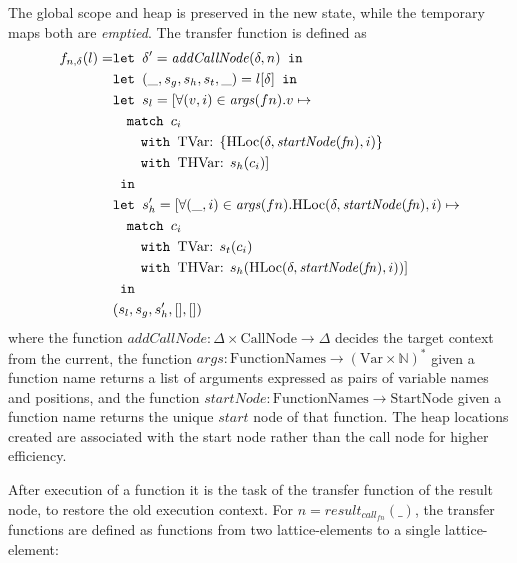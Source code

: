 The global scope and heap is preserved in the new state, while the temporary maps both are \emph{emptied}. The transfer function is defined as
\begin{align}
      f_{n,\delta}(l) =     &\texttt{let } \delta' = \mathit{addCallNode}(\delta, n) \texttt{ in }\notag\\
                            &\texttt{let } (\_, s_g, s_h,s_t, \_) = l[\delta] \texttt{ in }\notag\\
                            &\texttt{let } s_l = [\forall (v, i) \in \mathit{args}(fn). v \mapsto \notag\\
                            &\quad\texttt{match }c_i\notag\\
                            &\quad\quad\texttt{with }\text{TVar}\text{: } \{\text{HLoc}(\delta, \mathit{startNode}(\mathit{fn}), i)\}\notag\\
                            &\quad\quad\texttt{with }\text{THVar}\text{: } s_h(c_i)]\notag\\
                            & \texttt{ in }\notag\\
                            &\texttt{let } s_h' = [\forall (\_, i) \in \mathit{args}(fn). \text{HLoc}(\delta, \mathit{startNode}(\mathit{fn}), i) \mapsto \notag\\
                            &\quad\texttt{match }c_i\notag\\
                            &\quad\quad\texttt{with }\text{TVar}\text{: } s_t(c_i)\notag\\
                            &\quad\quad\texttt{with }\text{THVar}\text{: } s_h(\text{HLoc}(\delta, \mathit{startNode}(\mathit{fn}), i))]\notag\\
                            & \texttt{ in }\notag\\
                            &(s_l, s_g, s_h',[], [])
\end{align}
where the function $\mathit{addCallNode} : \Delta \times \text{CallNode} \rightarrow \Delta$ decides the target context from the current, the function $\mathit{args} : \text{FunctionNames} \rightarrow (\text{Var} \times \mathbb{N})^*$ given a function name returns a list of arguments expressed as pairs of variable names and positions, and the function $\mathit{startNode} : \text{FunctionNames} \rightarrow \text{StartNode}$ given a function name returns the unique $\mathit{start}$ node of that function. The heap locations created are associated with the start node rather than the call node for higher efficiency.

After execution of a function it is the task of the transfer function of the result node, to restore the old execution context. For $n = \mathit{result}_{\mathit{call}_{fn}}(\_)$, the transfer functions are defined as functions from two lattice-elements to a single lattice-element:

